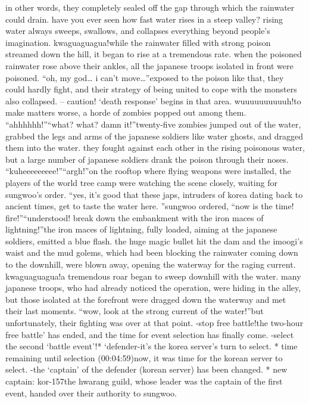in other words, they completely sealed off the gap through which the rainwater could drain.
have you ever seen how fast water rises in a steep valley? rising water always sweeps, swallows, and collapses everything beyond people’s imagination.
kwaguaguagua!while the rainwater filled with strong poison streamed down the hill, it began to rise at a tremendous rate.
 when the poisoned rainwater rose above their ankles, all the japanese troops isolated in front were poisoned.
“oh, my god… i can’t move…”exposed to the poison like that, they could hardly fight, and their strategy of being united to cope with the monsters also collapsed.
– caution! ‘death response’ begins in that area.
wuuuuuuuuuuh!to make matters worse, a horde of zombies popped out among them.
“ahhhhhh!”“what? what? damn it!”twenty-five zombies jumped out of the water, grabbed the legs and arms of the japanese soldiers like water ghosts, and dragged them into the water.
they fought against each other in the rising poisonous water, but a large number of japanese soldiers drank the poison through their noses.
“kuheeeeeeeee!”“argh!”on the rooftop where flying weapons were installed, the players of the world tree camp were watching the scene closely, waiting for sungwoo’s order.
“yes, it’s good that these japs, intruders of korea dating back to ancient times, get to taste the water here.
”sungwoo ordered, “now is the time! fire!”“understood! break down the embankment with the iron maces of lightning!”the iron maces of lightning, fully loaded, aiming at the japanese soldiers, emitted a blue flash.
the huge magic bullet hit the dam and the imoogi’s waist and the mud golems, which had been blocking the rainwater coming down to the downhill, were blown away, opening the waterway for the raging current.
kwaguaguagua!a tremendous roar began to sweep downhill with the water.
many japanese troops, who had already noticed the operation, were hiding in the alley, but those isolated at the forefront were dragged down the waterway and met their last moments.
“wow, look at the strong current of the water!”but unfortunately, their fighting was over at that point.
-stop free battle!the two-hour free battle’ has ended, and the time for event selection has finally come.
-select the second ‘battle event’!* ‘defender-it’s the korea server’s turn to select.
* time remaining until selection (00:04:59)now, it was time for the korean server to select.
-the ‘captain’ of the defender (korean server) has been changed.
* new captain: kor-157the hwarang guild, whose leader was the captain of the first event, handed over their authority to sungwoo.
